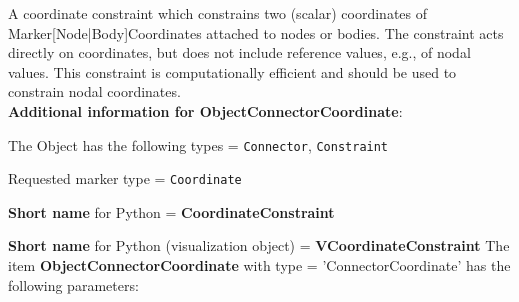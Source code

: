 %
\newpage

\label{sec:item:ObjectConnectorCoordinate}
A coordinate constraint which constrains two (scalar) coordinates of Marker[Node|Body]Coordinates attached to nodes or bodies. The constraint acts directly on coordinates, but does not include reference values, e.g., of nodal values. This constraint is computationally efficient and should be used to constrain nodal coordinates.\vspace{12pt}
 \\{\bf Additional information for ObjectConnectorCoordinate}:
\bi
  \item The Object has the following types = \texttt{Connector}, \texttt{Constraint}
  \item Requested marker type = \texttt{Coordinate}
  \item {\bf Short name} for Python = {\bf CoordinateConstraint}  \item {\bf Short name} for Python (visualization object) = {\bf VCoordinateConstraint}\ei
\vspace{12pt} \noindent The item {\bf ObjectConnectorCoordinate} with type = 'ConnectorCoordinate' has the following parameters:\vspace{-1cm}\\ 
